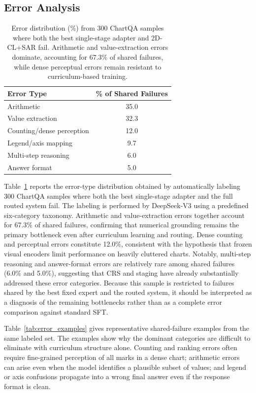 \documentclass[journal]{IEEEtran}
\newcommand{\method}{2D-CL}
\newcommand{\crs}{CRS}
\newcommand{\sar}{SAR}
\begin{document}
\subsection{Error Analysis}
\begin{table}[!t]
\centering
\small
\begin{tabular}{lc}
\toprule
\textbf{Error Type} & \textbf{\% of Shared Failures} \\
\midrule
Arithmetic & 35.0 \\
Value extraction & 32.3 \\
Counting/dense perception & 12.0 \\
Legend/axis mapping & 9.7 \\
Multi-step reasoning & 6.0 \\
Answer format & 5.0 \\
\bottomrule
\end{tabular}
\vspace{4pt}
\caption{Error distribution (\%) from 300 ChartQA samples where both the best single-stage adapter and \method{}+\sar{} fail. Arithmetic and value-extraction errors dominate, accounting for 67.3\% of shared failures, while dense perceptual errors remain resistant to curriculum-based training.}
\label{tab:error}
\end{table}

Table~\ref{tab:error} reports the error-type distribution obtained by automatically labeling 300 ChartQA samples where both the best single-stage adapter and the full routed system fail.
The labeling is performed by DeepSeek-V3 using a predefined six-category taxonomy.
Arithmetic and value-extraction errors together account for 67.3\% of shared failures, confirming that numerical grounding remains the primary bottleneck even after curriculum learning and routing.
Dense counting and perceptual errors constitute 12.0\%, consistent with the hypothesis that frozen visual encoders limit performance on heavily cluttered charts.
Notably, multi-step reasoning and answer-format errors are relatively rare among shared failures (6.0\% and 5.0\%), suggesting that \crs{} and staging have already substantially addressed these error categories.
Because this sample is restricted to failures shared by the best fixed expert and the routed system, it should be interpreted as a diagnosis of the remaining bottlenecks rather than as a complete error comparison against standard SFT.

Table~\ref{tab:error_examples} gives representative shared-failure examples from the same labeled set.
The examples show why the dominant categories are difficult to eliminate with curriculum structure alone.
Counting and ranking errors often require fine-grained perception of all marks in a dense chart; arithmetic errors can arise even when the model identifies a plausible subset of values; and legend or axis confusions propagate into a wrong final answer even if the response format is clean.
\end{document}
